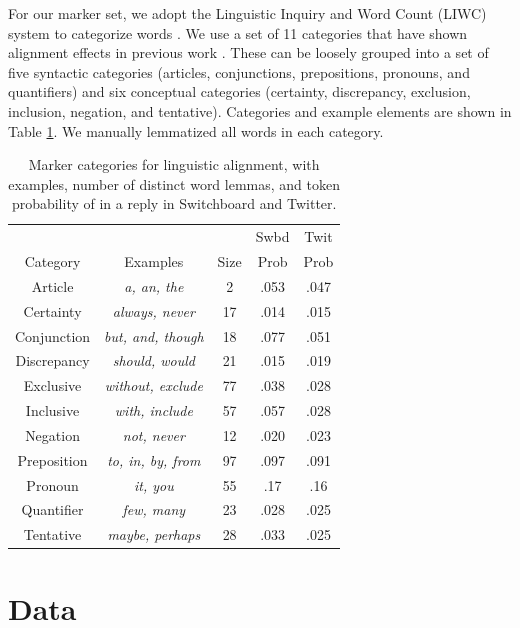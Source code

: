 \documentclass[11pt]{article}
\begin{document}
For our marker set, we adopt the Linguistic Inquiry and Word Count (LIWC) system to categorize words \cite{LIWC}.  We use a set of 11 categories that have shown alignment effects in previous work \cite{DNMGamonDumais2011}. These can be loosely grouped into a set of five syntactic categories (articles, conjunctions, prepositions, pronouns, and quantifiers) and six conceptual categories (certainty, discrepancy, exclusion, inclusion, negation, and tentative). Categories and example elements are shown in Table \ref{table:liwc}. We manually lemmatized all words in each category.

\begin{table}
\centering
\small
\begin{tabular}{|c|c|c|c|c|} \hline
& & & Swbd & Twit \\
Category & Examples & Size & Prob & Prob\\ \hline
Article & \textit{a, an, the} & 2 & .053 & .047\\
Certainty  & \textit{always, never} & 17 & .014 & .015\\
Conjunction  & \textit{but, and, though} & 18 & .077 & .051\\
Discrepancy  & \textit{should, would} & 21 & .015 & .019\\
Exclusive  & \textit{without, exclude} & 77 & .038 & .028\\
Inclusive  & \textit{with, include} & 57 & .057 & .028\\
Negation  & \textit{not, never} & 12 & .020 & .023\\
Preposition  & \textit{to, in, by, from} & 97 & .097 & .091\\
Pronoun   & \textit{it, you} & 55 & .17 & .16\\
Quantifier  & \textit{few, many} & 23 & .028 & .025\\
Tentative & \textit{maybe, perhaps} & 28 & .033 & .025\\
\hline\end{tabular}
\caption{Marker categories for linguistic alignment, with examples, number of distinct word lemmas, and token probability of in a reply in Switchboard and Twitter.}\label{table:liwc}
\end{table}

\section{Data}
\end{document}
